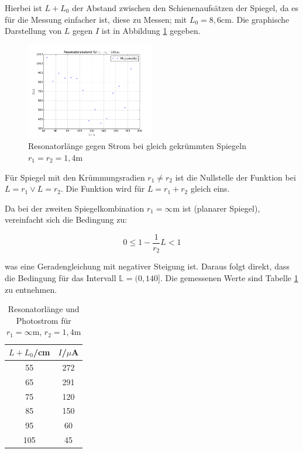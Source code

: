 \noindent Hierbei ist \(L+L_0\) der Abstand zwischen den Schienenaufsätzen der Spiegel, da es für die Messung einfacher ist, diese zu Messen; mit \(L_0=8,6\text{cm}\). Die graphische Darstellung von \(L\) gegen \(I\) ist in Abbildung \ref{fig:stabil1} gegeben.

\begin{figure}
	\centering
	\includegraphics[width=0.5\textwidth]{plots/stabil1}
	\caption{Resonatorlänge gegen Strom bei gleich gekrümmten Spiegeln \(r_1=r_2=1,4\)m}
	\label{fig:stabil1}
\end{figure}

\noindent Für Spiegel mit den Krümmungsradien \(r_1\neq r_2\) ist die Nullstelle der Funktion bei \(L=r_1\lor L=r_2\). Die Funktion wird für \(L=r_1+r_2\) gleich eins.

\noindent Da bei der zweiten Spiegelkombination \(r_1=\infty\)m ist (planarer Spiegel), vereinfacht sich die Bedingung zu:

\begin{equation}
0\le1-\frac{1}{r_2}L<1
\end{equation}

\noindent was eine Geradengleichung mit negativer Steigung ist. Daraus folgt direkt, dass die Bedingung für das Intervall \(\mathbb{L}=(0,140]\). Die gemessenen Werte sind Tabelle \ref{tab:t2} zu entnehmen.

\begin{table}[H]
	\begin{center}
		\begin{tabular}{c c}
			\toprule
			\(L+L_0\)/cm & \(I\)/\(\mu\)A \\
			\midrule
			55              &272\\                                                                           
			65              &291\\                                                                             
			75              &120\\                                                                               
			85              &150\\                                                                                 
			95              &60\\                                                                                  
			105             &45\\
			\bottomrule
		\end{tabular}
		\caption{Resonatorlänge und Photostrom für \(r_1=\infty\)m, \(r_2=1,4\)m}
		\label{tab:t2}
	\end{center}
\end{table}

